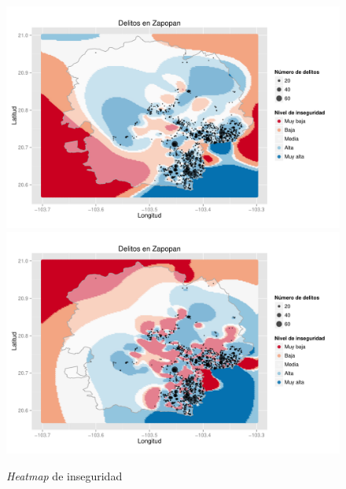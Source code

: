 \begin{figure}[H]
\centering
\caption{\textit{Heatmap} de inseguridad}
\includegraphics[width=120mm]{../../graphs/heat_y_delitos.pdf}
\includegraphics[width=120mm]{../../graphs/heat_y_delitos2.pdf}
\end{figure}

